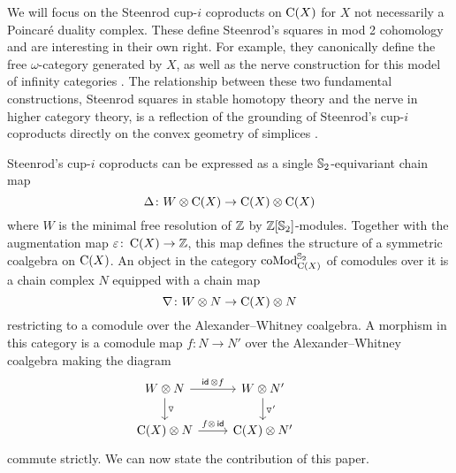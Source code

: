 We will focus on the Steenrod cup-$i$ coproducts on $\operatorname{C}(X)$ for $X$ not necessarily a Poincar\'e duality complex.
These define Steenrod's squares in mod 2 cohomology and are interesting in their own right.
For example, they canonically define the free $\omega$-category generated by $X$, as well as the nerve construction for this model of infinity categories \cite{medina2020globular}.
The relationship between these two fundamental constructions, Steenrod squares in stable homotopy theory and the nerve in higher category theory, is a reflection of the grounding of Steenrod's cup-$i$ coproducts directly on the convex geometry of simplices \cite{medina2022fib_poly}.

Steenrod's cup-$i$ coproducts can be expressed as a single $\mathbb{S}_2$-equivariant chain map
\[
\operatorname{\Delta} \colon W \otimes \operatorname{C}(X) \to \operatorname{C}(X) \otimes \operatorname{C}(X)
\]
where $W$ is the minimal free resolution of $\mathbb{Z}$ by $\mathbb{Z}[\mathbb{S}_2]$-modules.
Together with the augmentation map $\varepsilon \colon \operatorname{C}(X) \to \mathbb{Z}$, this map defines the structure of a symmetric coalgebra on $\operatorname{C}(X)$.
An object in the category $\operatorname{coMod}_{\operatorname{C}(X)}^{\mathbb{S}_2}$ of comodules over it is a chain complex $N$ equipped with a chain map
\[
\nabla \colon W \otimes N \to \operatorname{C}(X) \otimes N
\]
restricting to a comodule over the Alexander--Whitney coalgebra.
A morphism in this category is a comodule map $f \colon N \to N'$ over the Alexander--Whitney coalgebra making the diagram
\[
\begin{tikzcd}
	W \ot N \arrow[d, "\triangledown"] \arrow[r, "\id\, \ot f"] &
	W \ot N' \arrow[d, "\triangledown'"] & \\
	\chains(X) \ot N \arrow[r, "f \ot\, \id"] &
	\chains(X) \ot N'
\end{tikzcd}
\]
commute strictly.
%
We can now state the contribution of this paper.

